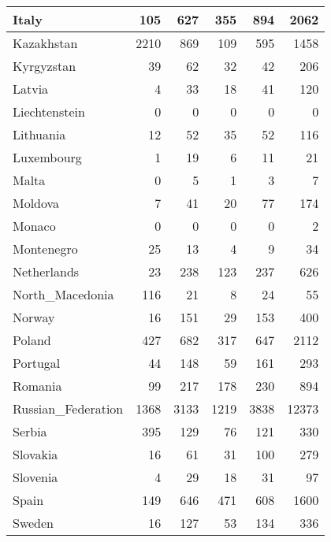 \begin{table}
\begin{center}
\begin{tabular}{|l|r|r|r|r|r|}
                         Italy&   105&   627&   355&   894&  2062 \\\hline
                    Kazakhstan&  2210&   869&   109&   595&  1458 \\\hline
                    Kyrgyzstan&    39&    62&    32&    42&   206 \\\hline
                        Latvia&     4&    33&    18&    41&   120 \\\hline
                 Liechtenstein&     0&     0&     0&     0&     0 \\\hline
                     Lithuania&    12&    52&    35&    52&   116 \\\hline
                    Luxembourg&     1&    19&     6&    11&    21 \\\hline
                         Malta&     0&     5&     1&     3&     7 \\\hline
                       Moldova&     7&    41&    20&    77&   174 \\\hline
                        Monaco&     0&     0&     0&     0&     2 \\\hline
                    Montenegro&    25&    13&     4&     9&    34 \\\hline
                   Netherlands&    23&   238&   123&   237&   626 \\\hline
               North_Macedonia&   116&    21&     8&    24&    55 \\\hline
                        Norway&    16&   151&    29&   153&   400 \\\hline
                        Poland&   427&   682&   317&   647&  2112 \\\hline
                      Portugal&    44&   148&    59&   161&   293 \\\hline
                       Romania&    99&   217&   178&   230&   894 \\\hline
            Russian_Federation&  1368&  3133&  1219&  3838& 12373 \\\hline
                        Serbia&   395&   129&    76&   121&   330 \\\hline
                      Slovakia&    16&    61&    31&   100&   279 \\\hline
                      Slovenia&     4&    29&    18&    31&    97 \\\hline
                         Spain&   149&   646&   471&   608&  1600 \\\hline
                        Sweden&    16&   127&    53&   134&   336 \\\hline

\end{tabular}
\end{center}
\end{table}
